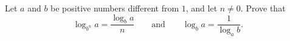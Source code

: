 Let $a$ and $b$ be positive numbers different from $1$, and let $n\ne0$. Prove that
\[\log_{b^n}a=\dfrac{\log_ba}{n}\qquad\text{and}\qquad\log_ba=\dfrac{1}{\log_ab}.\]

